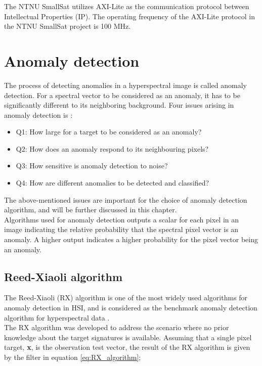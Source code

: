 The NTNU SmallSat utilizes AXI-Lite as the communication protocol between Intellectual Properties (IP). The operating frequency of the AXI-Lite protocol in the NTNU SmallSat project is 100 MHz. 


\section{Anomaly detection}
\label{sec:anomaly_detectors_theory}
The process of detecting anomalies in a hyperspectral image is called anomaly detection. For a spectral vector to be considered as an anomaly, it has to be significantly different to its neighboring background. Four issues arising in anomaly detection is \cite{chang2006characterization}:
\\
 
\begin{itemize}
  \item Q1: How large for a target to be considered as an anomaly?
  \item Q2: How does an anomaly respond to its neighbouring pixels?
  \item Q3: How sensitive is anomaly detection to noise?
  \item Q4: How are different anomalies to be detected and classified?
\end{itemize}

The above-mentioned issues are important for the choice of anomaly detection algorithm, and will be further discussed in this chapter.
\\
Algorithms used for anomaly detection outputs a scalar for each pixel in an image indicating the relative probability that the spectral pixel vector is an anomaly. A higher output indicates a higher probability for the pixel vector being an anomaly.


\subsection{Reed-Xiaoli algorithm}
\label{sec:RX_theory}
The Reed-Xiaoli (RX) algorithm \cite{reed1990adaptive} is one of the most widely used algorithms for anomaly detection in HSI, and is considered as the benchmark anomaly detection algorithm for hyperspectral data \cite{yang2015dual}.  
\\
The RX algorithm was developed to address the scenario where no prior knowledge about the target signatures is available. Assuming that a single pixel target, \textbf{x}, is the observation test vector, the result of the RX algorithm is given by the filter in equation \ref{eq:RX_algorithm};

